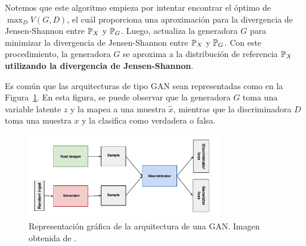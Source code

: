 {{\begin{remark}
    Notemos que este algoritmo empieza por intentar encontrar el óptimo de $\max_D V(G, D)$, el cuál proporciona una aproximación para la divergencia de Jensen-Shannon entre $\Prob_X$ y $\Prob_G$. Luego, actualiza la generadora $G$ para minimizar la divergencia de Jensen-Shannon entre $\Prob_X$ y $\Prob_G$. Con este procedimiento, la generadora $G$ se aproxima a la distribución de referencia $\Prob_X$ \textbf{utilizando la divergencia de Jensen-Shannon}.
\end{remark}

Es común que las arquitecturas de tipo GAN sean representadas como en la Figura~\ref{fig:gan-diagram}. En esta figura, se puede observar que la generadora $G$ toma una variable latente $z$ y la mapea a una muestra $\hat x$, mientras que la discriminadora $D$ toma una muestra $x$ y la clasifica como verdadera o falsa.

\begin{figure}[htbp]
    \centering
    \includegraphics[width=0.75\textwidth]{img/gan/gan_diagram.pdf}
    \caption{Representación gráfica de la arquitectura de una GAN. Imagen obtenida de \cite{googlegan}.}
    \label{fig:gan-diagram}
\end{figure}















}  %



}  %